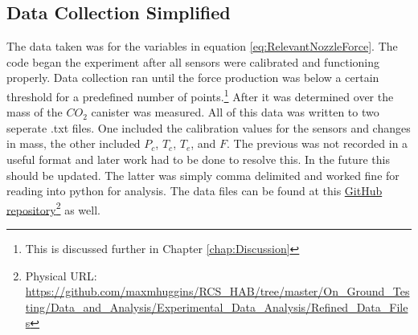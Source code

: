 \subsection{Data Collection Simplified}
The data taken was for the variables in equation \ref{eq:RelevantNozzleForce}. The code began the experiment after all sensors were calibrated and functioning properly. Data collection ran until the force production was below a certain threshold for a predefined number of points.\footnote{This is discussed further in Chapter \ref{chap:Discussion}} After it was determined over the mass of the $CO_2$ canister was measured. All of this data was written to two seperate .txt files. One included the calibration values for the sensors and changes in mass, the other included $P_c$, $T_c$, $T_e$, and $F$. The previous was not recorded in a useful format and later work had to be done to resolve this. In the future this should be updated. The latter was simply comma delimited and worked fine for reading into python for analysis. The data files can be found at this \href{https://github.com/maxmhuggins/RCS_HAB/tree/master/On_Ground_Testing/Data_and_Analysis/Experimental_Data_Analysis/Refined_Data_Files}{GitHub repository}\footnote{Physical URL: \url{https://github.com/maxmhuggins/RCS_HAB/tree/master/On_Ground_Testing/Data_and_Analysis/Experimental_Data_Analysis/Refined_Data_Files}} as well.